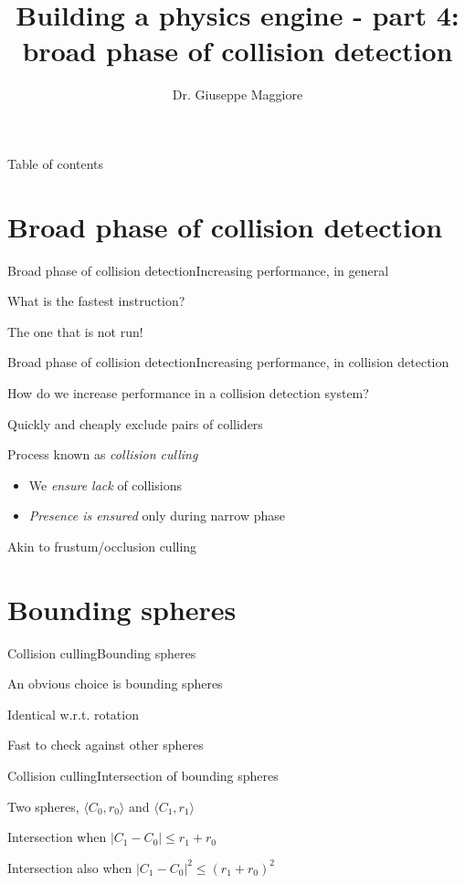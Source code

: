 \documentclass{beamer}
\title{Building a physics engine - part 4: broad phase of collision detection}
\author{Dr. Giuseppe Maggiore}
\institute{NHTV University of Applied Sciences \\ 
Breda, Netherlands}
\date{}
\begin{document}
\maketitle

\begin{frame}{Table of contents}
\tableofcontents
\end{frame}

\section{Broad phase of collision detection}
\begin{slide}{Broad phase of collision detection}{Increasing performance, in general}{
\item What is the fastest instruction?
\pause
\item The one that is not run!
}\end{slide}

\begin{slide}{Broad phase of collision detection}{Increasing performance, in collision detection}{
\item How do we increase performance in a collision detection system?
\item Quickly and cheaply exclude pairs of colliders
\item Process known as \textit{collision culling}
\begin{itemize}
\item We \textit{ensure lack} of collisions
\item \textit{Presence is ensured} only during narrow phase
\end{itemize}
\item Akin to frustum/occlusion culling
}\end{slide}

\section{Bounding spheres}
\begin{slide}{Collision culling}{Bounding spheres}{
\item An obvious choice is bounding spheres
\item Identical w.r.t. rotation
\item Fast to check against other spheres
}\end{slide}

\begin{slide}{Collision culling}{Intersection of bounding spheres}{
\item Two spheres, $\langle C_0, r_0 \rangle$ and $\langle C_1, r_1 \rangle$
\item Intersection when $|C_1 - C_0| \leq r_1 + r_0$
\item Intersection also when $|C_1 - C_0|^2 \leq (r_1 + r_0)^2$
}\end{slide}
\end{document}
